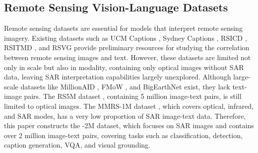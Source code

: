 \subsection{Remote Sensing Vision-Language Datasets}
Remote sensing datasets are essential for models that interpret remote sensing imagery. Existing datasets such as UCM Captions \cite{7546397}, Sydney Captions \cite{qu2016deep}, RSICD \citep{lu2017exploring}, RSITMD \citep{yuan2022exploring}, and RSVG \citep{zhan2023rsvg} provide preliminary resources for studying the correlation between remote sensing images and text. However, these datasets are limited not only in scale but also in modality, containing only optical images without SAR data, leaving SAR interpretation capabilities largely unexplored. Although large-scale datasets like MillionAID \citep{long2021creating}, FMoW \citep{christie2018functional}, and BigEarthNet \citep{sumbul2019bigearthnet} exist, they lack text-image pairs. The RS5M  dataset \citep{zhang2023rs5m}, containing 5 million image-text pairs, is still limited to optical images. The MMRS-1M dataset \citep{zhang2024earthgpt}, which covers optical, infrared, and SAR modes, has a very low proportion of SAR image-text data. Therefore, this paper constructs the \ourmethod-2M dataset, which focuses on SAR images and contains over 2 million image-text pairs, covering tasks such as classification, detection, caption generation, VQA, and visual grounding.